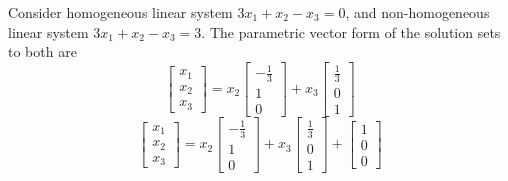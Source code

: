 \documentclass{beamer}
\theoremstyle{definition}
\theoremstyle{remark}
\begin{document}
\begin{frame}[t]
\begin{example}
Consider homogeneous linear system $3x_1+x_2-x_3=0$, and non-homogeneous linear system $3x_1+x_2-x_3=3$. The parametric vector form of the solution sets to both are\pause
\[
\begin{bmatrix}
x_1\\x_2\\x_3
\end{bmatrix}=x_2\begin{bmatrix}
-\frac{1}{3}\\1\\0
\end{bmatrix}+x_3\begin{bmatrix}
\frac{1}{3}\\0\\1
\end{bmatrix}
\]
\[
\begin{bmatrix}
x_1\\x_2\\x_3
\end{bmatrix}=x_2\begin{bmatrix}
-\frac{1}{3}\\1\\0
\end{bmatrix}+x_3\begin{bmatrix}
\frac{1}{3}\\0\\1
\end{bmatrix}+\begin{bmatrix}
1\\0\\0
\end{bmatrix}
\]
\end{example}
\end{frame}
\end{document}

